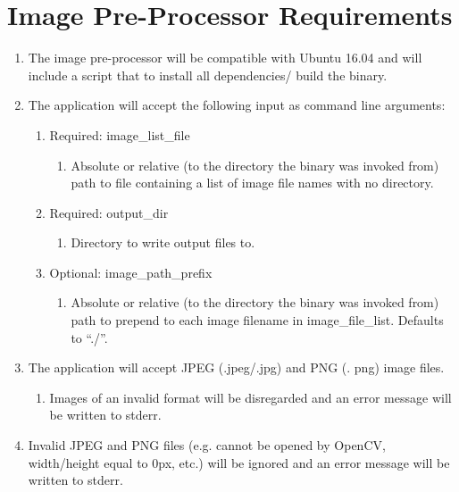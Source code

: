 \documentclass[10pt, onecolumn, draftclsnofoot, letterpaper]{IEEEtran}
\begin{document}
\section{Image Pre-Processor Requirements}

\begin{enumerate}
	\item The image pre-processor will be compatible with Ubuntu 16.04 and will include a script that to install all dependencies/
	build the binary.

	\item The application will accept the following input as 
	command line arguments:
	\begin{enumerate}
		\item Required: image\_list\_file
		\begin{enumerate}
			\item Absolute or relative (to the directory the binary 
			was invoked from) path to file containing a list of image 
			file names with no directory.
		\end{enumerate}

		\item Required: output\_dir
		\begin{enumerate}
			\item Directory to write output files to.
		\end{enumerate}

		\item Optional: image\_path\_prefix
		\begin{enumerate}
			\item Absolute or relative (to the directory the 
			binary was invoked from) path to prepend to each image 
			filename in image\_file\_list. Defaults to “./”.
		\end{enumerate}
	\end{enumerate}

	\item The application will accept JPEG (.jpeg/.jpg) and PNG (.
	png) image files.
	\begin{enumerate}
		\item Images of an invalid format will be disregarded and an error message will be written to stderr.
	\end{enumerate}

	\item Invalid JPEG and PNG files (e.g. cannot be opened by 
	OpenCV, width/height equal to 0px, etc.) will be ignored and 
	an error message will be written to stderr.


\end{enumerate}
\end{document}
